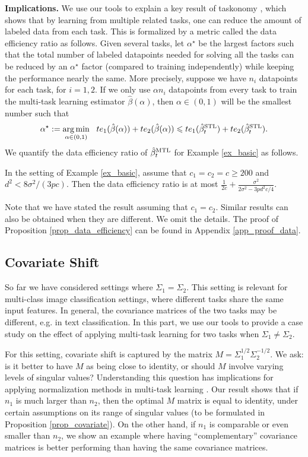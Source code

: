 \textbf{Implications.} We use our tools to explain a key result of taskonomy \cite{ZSSGM18}, which shows that by learning from multiple related tasks, one can reduce the amount of labeled data from each task.
This is formalized by a metric called the data efficiency ratio as follows.
Given several tasks, let $\alpha^{\star}$ be the largest factors such that the total number of labeled datapoints needed for solving all the tasks can be reduced by an $\alpha^{\star}$ factor (compared to training independently) while keeping the performance nearly the same.
More precisely, suppose we have $n_i$ datapoints for each task, for $i= 1, 2$.
If we only use $\alpha n_i$ datapoints from every task to train the multi-task learning estimator $\hat{\beta}(\alpha)$, then $\alpha \in (0, 1)$ will be the smallest number such that
\[ \alpha^{\star} :=\operatorname*{arg\,min}_{\alpha\in(0, 1)} ~~ te_1(\hat{\beta}(\alpha)) + te_2(\hat{\beta}(\alpha))\leqslant te_1(\hat{\beta}_t^{\text{STL}}) + te_2(\hat{\beta}_t^{\text{STL}}). \]
We quantify the data efficiency ratio of $\hat{\beta}_t^{\text{MTL}}$ for Example \ref{ex_basic} as follows.

\begin{proposition}\label{prop_data_efficiency}
	In the setting of Example \ref{ex_basic}, assume that $c_1 = c_2 = c \ge 200$ and $d^2 < {8\sigma^2} /{(3p c)}$.
	Then the data efficiency ratio is at most $\frac{1}{2c} + \frac{\sigma^2}{2\sigma^2 - 3p d^2 c / 4}$.
\end{proposition}
Note that we have stated the result assuming that $c_1 = c_2$.
Similar results can also be obtained when they are different.
We omit the details.
The proof of Proposition \ref{prop_data_efficiency} can be found in Appendix \ref{app_proof_data}.




\subsection{Covariate Shift}

So far we have considered settings where $\Sigma_1 = \Sigma_2$.
This setting is relevant for multi-class image classification settings, where different tasks share the same input features.
In general, the covariance matrices of the two tasks may be different, e.g. in text classification.
In this part, we use our tools to provide a case study on the effect of applying multi-task learning for two tasks when $\Sigma_1 \neq \Sigma_2$.

For this setting, covariate shift is captured by the matrix $M = \Sigma_1^{1/2} \Sigma_2^{-1/2}$.
We ask: is it better to have $M$ as being close to identity, or should $M$ involve varying levels of singular values?
Understanding this question has implications for applying normalization methods in multi-task learning \cite{LV19,CBLR18,YKGLHF20}.
Our result shows that if $n_1$ is much larger than $n_2$, then the optimal $M$ matrix is equal to identity, under certain assumptions on its range of singular values (to be formulated in Proposition \ref{prop_covariate}).
On the other hand, if $n_1$ is comparable or even smaller than $n_2$, we show an example where having ``complementary'' covariance matrices is better performing than having the same covariance matrices.

